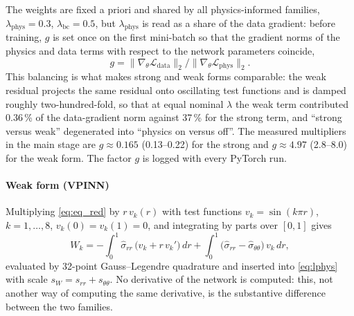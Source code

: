 \documentclass[pdflatex,sn-basic,Numbered]{sn-jnl}
\begin{document}
The weights are fixed a priori and shared by all physics-informed families,
$\lambda_{\mathrm{phys}}=0.3$, $\lambda_{\mathrm{bc}}=0.5$,
but $\lambda_{\mathrm{phys}}$ is read as a share of the data gradient: before
training, $g$ is set once on the first mini-batch so that the gradient norms of
the physics and data terms with respect to the network parameters coincide,
\begin{equation}
  g = \lVert\nabla_{\theta}\mathcal{L}_{\mathrm{data}}\rVert_2 \big/
      \lVert\nabla_{\theta}\mathcal{L}_{\mathrm{phys}}\rVert_2 .
  \label{eq:calib}
\end{equation}
This balancing \citep{wang2022} is what makes strong and weak
forms comparable: the weak residual projects the same residual onto oscillating
test functions and is damped roughly two-hundred-fold, so that at equal nominal
$\lambda$ the weak term contributed 0.36\,\% of the data-gradient norm against
37\,\% for the strong term, and ``strong versus weak'' degenerated into ``physics
on versus off''.
The measured multipliers in the main stage are $g\approx0.165$ (0.13--0.22) for
the strong and $g\approx4.97$ (2.8--8.0) for the weak form. The factor $g$ is logged with
every PyTorch run.

\paragraph{Weak form (VPINN)}
Multiplying \eqref{eq:eq_red} by $r\,v_k(r)$ with test functions
$v_k=\sin(k\pi r)$, $k=1,\dots,8$, $v_k(0)=v_k(1)=0$, and integrating by parts over
$[0,1]$ gives \citep{kharazmi2021}
\begin{equation}
  W_k = -\int_0^1 \hat\sigma_{rr}\,\bigl(v_k + r\,v_k'\bigr)\,dr
        + \int_0^1 \bigl(\hat\sigma_{rr}-\hat\sigma_{\theta\theta}\bigr)\,v_k\,dr ,
  \label{eq:weak}
\end{equation}
evaluated by 32-point Gauss--Legendre quadrature and inserted into
\eqref{eq:lphys} with scale $s_W=s_{rr}+s_{\theta\theta}$.
No derivative of the network is computed: this, not another way of computing the
same derivative, is the substantive difference between the two families.
\end{document}
